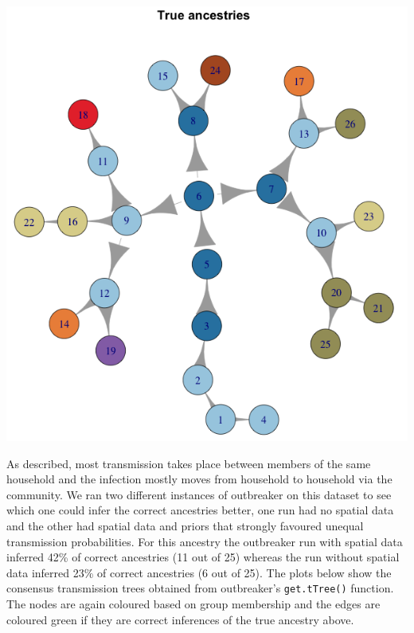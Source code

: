 \documentclass[11pt,a4paper]{report}
\begin{document}
\begin{center}
\includegraphics[scale=0.5]{ancestree.png}
\end{center}
As described, most transmission takes place between members of the same household and the infection mostly moves from household to household via the community. We ran two different instances of outbreaker on this dataset to see which one could infer the correct ancestries better, one run had no spatial data and the other had spatial data and priors that strongly favoured unequal transmission probabilities. For this ancestry the outbreaker run with spatial data inferred 42\% of correct ancestries (11 out of 25) whereas the run without spatial data inferred 23\% of correct ancestries (6 out of 25). The plots below show the consensus transmission trees obtained from outbreaker's {\tt get.tTree()} function. The nodes are again coloured based on group membership and the edges are coloured green if they are correct inferences of the true ancestry above.
\end{document}
